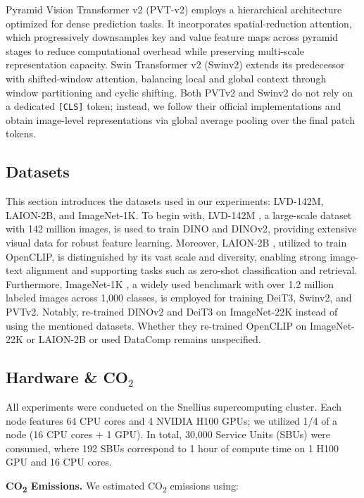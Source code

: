 \documentclass[10pt]{article} \usepackage[preprint]{tmlr}
\begin{document}
Pyramid Vision Transformer v2 (PVT-v2) \citep{wang2022pvt} employs a hierarchical architecture optimized for dense prediction tasks. It incorporates spatial-reduction attention, which progressively downsamples key and value feature maps across pyramid stages to reduce computational overhead while preserving multi-scale representation capacity. Swin Transformer v2 (Swinv2) \citep{liu2021swin} extends its predecessor with shifted-window attention, balancing local and global context through window partitioning and cyclic shifting. Both PVTv2 and Swinv2 do not rely on a dedicated \texttt{[CLS]} token; instead, we follow their official implementations and obtain image-level representations via global average pooling over the final patch tokens.

\subsection{Datasets}
This section introduces the datasets used in our experiments: LVD-142M, LAION-2B, and ImageNet-1K. To begin with, LVD-142M \citep{oquab2023dinov2}, a large-scale dataset with 142 million images, is used to train DINO and DINOv2, providing extensive visual data for robust feature learning. Moreover, LAION-2B \citep{laion5b}, utilized to train OpenCLIP, is distinguished by its vast scale and diversity, enabling strong image-text alignment and supporting tasks such as zero-shot classification and retrieval. Furthermore, ImageNet-1K \citep{deng2009imagenet}, a widely used benchmark with over 1.2 million labeled images across 1,000 classes, is employed for training DeiT3, Swinv2, and PVTv2. Notably, \citet{darcet2024registers} re-trained DINOv2 and DeiT3 on ImageNet-22K instead of using the mentioned datasets. Whether they re-trained OpenCLIP on ImageNet-22K or LAION-2B or used DataComp \citep{datacomp2023} remains unspecified.

\subsection{Hardware \& \texorpdfstring{CO$_2$}{CO2}}
All experiments were conducted on the Snellius supercomputing cluster. Each node features 64 CPU cores and 4 NVIDIA H100 GPUs; we utilized 1/4 of a node (16 CPU cores + 1 GPU). In total, 30,000 Service Units (SBUs) were consumed, where 192 SBUs correspond to 1 hour of compute time on 1 H100 GPU and 16 CPU cores.

\textbf{CO\textsubscript{2} Emissions.}  
We estimated CO\textsubscript{2} emissions using:
\end{document}
